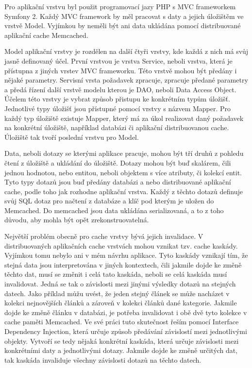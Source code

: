 \documentclass[12pt]{article}
\begin{document}
\label{app-model-memcached}
Pro aplikační vrstvu byl použit programovací jazy PHP s MVC frameworkem Symfony 2. Každý MVC framework by měl pracovat s daty a jejich úložištěm ve vrstvě Model. Vyjímkou by neměli být ani data ukládána pomocí distribuované aplikační cache Memcached.

Model aplikační vrstvy je rozdělen na další čtyři vrstvy, kde každá z nich má svůj jasně definovaný účel. První vrstvou je vrstva Service, neboli vrstva, která je přístupna z jiných vrstev MVC frameworku. Této vrstvě mohou být předány i nějaké parametry. Servisní vrsta požadavek zpracuje, zpracuje předané parametry a předá řízení další vrstvě modelu kterou je DAO, neboli Data Access Object. Účelem této vrstvy je vybrat způsob přistupu ke konkrétním typům úložišť. Jednotlivé typy úložišť jsou přístupné pomocí vrstvy s názvem Mapper. Pro každý typ úložiště existuje Mapper, který má za úkol realizovat daný požadavek na konkrétní úložiště, například databázi či aplikační distribuovanou cache. Úložiště tak tvoří poslední vrstvu pro Model.

Data, neboli dotazy se kterými aplikace pracuje, mohou být tří druhů z pohledu čtení z úložiště a ukládání do úložiště. Dotazy mohou být buď skalárem, čili jednou hodnotou, nebo entitou, neboli objektem s více atributy, či kolekcí entit. Tyto typy dotazů jsou buď předány databázi a nebo distribuované aplikační cache, podle toho jak rozhodne aplikační vrstva. Každý z těchto dotazů definuje svůj SQL dotaz pro načtení z databáze a klíč pod kterým je uložen do Memcached. Do memcached jsou data ukládána serializovaná, a to z toho důvodu, aby mohla být opět zrekonstruovatelná.

Největší problém obecně pro cache vrstvy bývá jejich invalidace. V distribuovaných aplikačních cache vrstvách mohou vznikat tzv. cache kaskády. Vyjímkou tomu nebylo ani v mém návrhu aplikace. Tyto kaskády vznikají tím, že stejná data jsou interpretována v jiných kontextech, čili jakmile dojde ke změně těchto dat, musí se změnit i celá tato kaskáda, neboli se celá kaskáda musí invalidovat. Jedná se tak o závislosti mezi jinými výsledky dotazů na stejných datech. Jako příklad můžu uvést, že jeden stejný článek se může nacházet v kolekci nejnovějších článků a zároveň v kolekci článků dané kategorie. Jakmile dojde ke změně článku v databázi, je potřeba invalidovat i obě dvě tyto kolekce v cache paměti Memcached. Ve své práci tuto skutečnost řeším pomocí Interface Dependency Injection, která určuje způsob předávání závislostí mezi jednotlivými objekty. Vytvoří se tedy nějaká konkrétní kaskáda, která určuje závislosti mezi konkrétními daty a jednotlivými dotazy. Jakmile dojde ke změně určitých dat, tak kaskáda invaliduje všechny závislosti dotazů na těchto datech.
\end{document}
